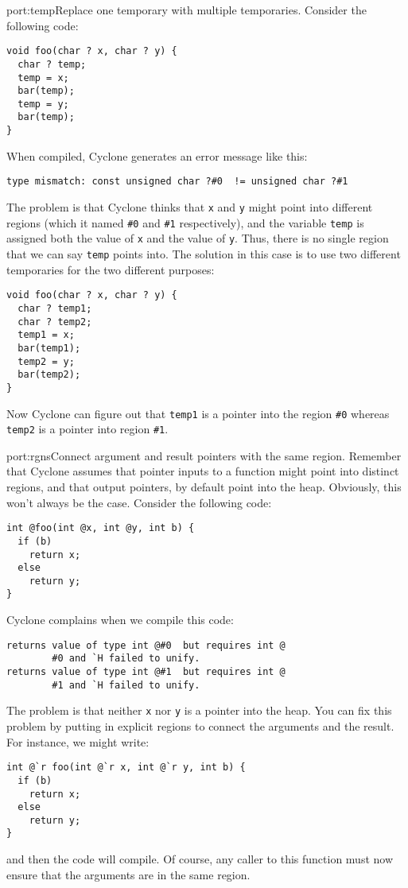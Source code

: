 \begin{porta}{port:temp}{Replace one temporary with multiple temporaries.}
Consider the following code:
\begin{verbatim}
void foo(char ? x, char ? y) {
  char ? temp;
  temp = x;
  bar(temp);
  temp = y;
  bar(temp);
}
\end{verbatim}

When compiled, Cyclone generates an error message like this:
\begin{verbatim}
type mismatch: const unsigned char ?#0  != unsigned char ?#1 
\end{verbatim}

The problem is that Cyclone thinks that \texttt{x} and \texttt{y}
might point into different regions (which it named \texttt{\#0} and
\texttt{\#1} respectively), and the variable \texttt{temp} is assigned
both the value of \texttt{x} and the value of \texttt{y}.  Thus,
there is no single region that we can say \texttt{temp} points into.
The solution in this case is to use two different temporaries for
the two different purposes:
\begin{verbatim}
void foo(char ? x, char ? y) {
  char ? temp1;
  char ? temp2;
  temp1 = x;
  bar(temp1);
  temp2 = y;
  bar(temp2);
}
\end{verbatim}

Now Cyclone can figure out that \texttt{temp1} is a pointer into
the region \texttt{\#0} whereas \texttt{temp2} is a pointer into
region \texttt{\#1}.  
\end{porta}

\begin{porta}{port:rgns}{Connect argument and result pointers with the same region.}
Remember that Cyclone assumes that pointer inputs to a function might
point into distinct regions, and that output pointers, by default point
into the heap.  Obviously, this won't always be the case.  Consider
the following code:
\begin{verbatim}
int @foo(int @x, int @y, int b) {
  if (b)
    return x;
  else
    return y;
}
\end{verbatim}

Cyclone complains when we compile this code:
\begin{verbatim}
returns value of type int @#0  but requires int @
        #0 and `H failed to unify. 
returns value of type int @#1  but requires int @
        #1 and `H failed to unify. 
\end{verbatim}
The problem is that neither \texttt{x} nor \texttt{y} is a pointer
into the heap.  You can fix this problem by putting in explicit regions
to connect the arguments and the result.  For instance, we might write:
\begin{verbatim}
int @`r foo(int @`r x, int @`r y, int b) {
  if (b)
    return x;
  else
    return y;
}
\end{verbatim}
and then the code will compile.  Of course, any caller to this function
must now ensure that the arguments are in the same region.  
\end{porta}


